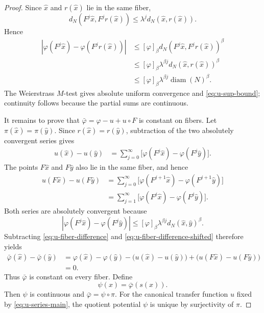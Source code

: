 \documentclass[11pt,a4paper]{article}
\newcommand{\diam}{\operatorname{diam}}
\begin{document}
\begin{proof}
Since $\hat x$ and $r(\hat x)$ lie in the same fiber,
\[
d_N(F^j\hat x,F^jr(\hat x))
\le \lambda^j d_N(\hat x,r(\hat x)).
\]
Hence
\begin{align*}
|\varphi(F^j\hat x)-\varphi(F^jr(\hat x))|
&\le [\varphi]_\beta
 d_N(F^j\hat x,F^jr(\hat x))^\beta\\
&\le [\varphi]_\beta\lambda^{\beta j}
 d_N(\hat x,r(\hat x))^\beta\\
&\le [\varphi]_\beta\lambda^{\beta j}\diam(N)^\beta.
\end{align*}
The Weierstrass $M$-test gives absolute uniform convergence and
\eqref{eq:u-sup-bound}; continuity follows because the partial sums are
continuous.

It remains to prove that
$\bar\varphi=\varphi-u+u\circ F$ is constant on fibers. Let
$\pi(\hat x)=\pi(\hat y)$. Since $r(\hat x)=r(\hat y)$, subtraction of
the two absolutely convergent series gives
\begin{align}
u(\hat x)-u(\hat y)
&=\sum_{j=0}^{\infty}
\bigl[\varphi(F^j\hat x)-\varphi(F^j\hat y)\bigr].
\label{eq:u-fiber-difference}
\end{align}
The points $F\hat x$ and $F\hat y$ also lie in the same fiber, and hence
\begin{align}
u(F\hat x)-u(F\hat y)
&=\sum_{j=0}^{\infty}
\bigl[\varphi(F^{j+1}\hat x)-\varphi(F^{j+1}\hat y)\bigr]\\
&=\sum_{j=1}^{\infty}
\bigl[\varphi(F^j\hat x)-\varphi(F^j\hat y)\bigr].
\label{eq:u-fiber-difference-shifted}
\end{align}
Both series are absolutely convergent because
\[
|\varphi(F^j\hat x)-\varphi(F^j\hat y)|
\le [\varphi]_\beta\lambda^{\beta j}
 d_N(\hat x,\hat y)^\beta.
\]
Subtracting \eqref{eq:u-fiber-difference} and
\eqref{eq:u-fiber-difference-shifted} therefore yields
\begin{align*}
\bar\varphi(\hat x)-\bar\varphi(\hat y)
&=\varphi(\hat x)-\varphi(\hat y)
 -\bigl(u(\hat x)-u(\hat y)\bigr)
 +\bigl(u(F\hat x)-u(F\hat y)\bigr)\\
&=0.
\end{align*}
Thus $\bar\varphi$ is constant on every fiber. Define
\[
\psi(x)=\bar\varphi(s(x)).
\]
Then $\psi$ is continuous and $\bar\varphi=\psi\circ\pi$. For the
canonical transfer function $u$ fixed by \eqref{eq:u-series-main}, the quotient
potential $\psi$ is unique by surjectivity of $\pi$.
\end{proof}
\end{document}
